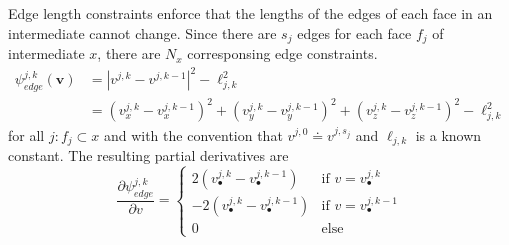 Edge length constraints enforce that the lengths of the edges of each face in an intermediate cannot change. Since there are $s_j$ edges for each face $f_j$ of intermediate $x$, there are $N_x$ corresponsing edge constraints. 
\begin{align}
\psi_{edge}^{j,k}\left(\mathbf{v}\right)& = \left|v^{j,k} - v^{j,k-1}\right|^2 - \ell_{j,k}^2 \\
& = \left(v_x^{j,k} - v_x^{j,k-1}\right)^2 +\left(v_y^{j,k} - v_y^{j,k-1}\right)^2 +\left(v_z^{j,k} - v_z^{j,k-1}\right)^2 - \ell_{j,k}^2 
\end{align}  
for all $j: f_j \subset x$ and with the convention that $v^{j,0} \doteq v^{j,s_j}$ and $\ell_{j,k}$ is a known constant. The resulting partial derivatives are
\[
	\frac{\partial\psi_{edge}^{j,k}}{\partial v} =
  	\begin{cases}
        	2\left(v^{j,k}_\bullet-v^{j,k-1}_\bullet\right) 	& \text{if } v = v^{j,k}_\bullet \\
   		-2\left(v^{j,k}_\bullet-v^{j,k-1}_\bullet\right) 	& \text{if } v = v^{j,k-1}_\bullet \\
   		0       & \text{else} 
  	\end{cases}
\]





